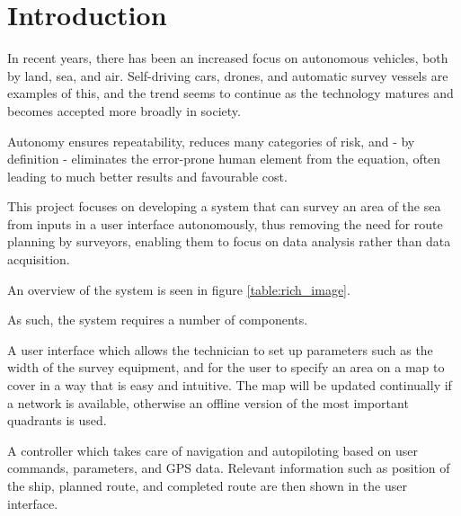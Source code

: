 \chapter{Introduction}
In recent years, there has been an increased focus on autonomous vehicles, both by land, sea, and air. Self-driving cars, drones, and automatic survey vessels are examples of this, and the trend seems to continue as the technology matures and becomes accepted more broadly in society.\cite{SD_cars}\cite{UAVs}\cite{USVs}

Autonomy ensures repeatability, reduces many categories of risk, and - by definition - eliminates the error-prone human element from the equation, often leading to much better results and favourable cost. 

This project focuses on developing a system that can survey an area of the sea from inputs in a user interface autonomously, thus removing the need for route planning by surveyors, enabling them to focus on data analysis rather than data acquisition. 

An overview of the system is seen in figure \ref{table:rich_image}.

As such, the system requires a number of components. 

A user interface which allows the technician to set up parameters such as the width of the survey equipment, and for the user to specify an area on a map to cover in a way that is easy and intuitive. The map will be updated continually if a network is available, otherwise an offline version of the most important quadrants is used.

A controller which takes care of navigation and autopiloting based on user commands, parameters, and GPS data. Relevant information such as position of the ship, planned route, and completed route are then shown in the user interface.

